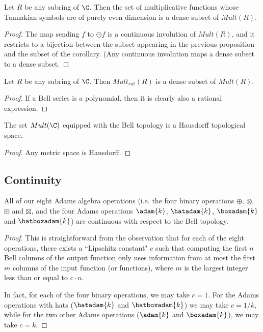 \documentclass[a4paper]{article}
\begin{document}
\begin{corollary}
Let $R$ be any subring of $\C$. Then the set of multiplicative functions whose Tannakian symbols are of purely even dimension is a dense subset of $Mult(R)$. 
\end{corollary}

\begin{proof}
The map sending $f$ to $\ominus f$ is a continuous involution of $Mult(R)$, and it restricts to a bijection between the subset appearing in the previous proposition and the subset of the corollary. (Any continuous involution maps a dense subset to a dense subset.
\end{proof}

\begin{corollary}
Let $R$ be any subring of $\C$. Then $Mult_{rat}(R)$ is a dense subset of $Mult(R)$. 
\end{corollary}

\begin{proof}
If a Bell series is a polynomial, then it is clearly also a rational expression.
\end{proof}

\begin{lemma}
The set $Mult(\C)$ equipped with the Bell topology is a Hausdorff topological space.
\end{lemma}
\begin{proof}
Any metric space is Hausdorff.
\end{proof}

\subsection{Continuity}


\begin{theorem} \label{AdamsAlgebraContinuity}
All of our eight Adams algebra operations (i.e. the four binary operations $\oplus$, $\otimes$, $\boxplus$ and $\boxtimes$, and the four Adams operations $\adam{k}$, $\hatadam{k}$, $\boxadam{k}$ and $\hatboxadam{k}$) are continuous with respect to the Bell topology.
\end{theorem}
\begin{proof}
This is straightforward from the observation that for each of the eight operations, there exists a ``Lipschitz constant" $c$ such that computing the first $n$ Bell columns of the output function only uses information from at most the first $m$ columns of the input function (or functions), where $m$ is the largest integer less than or equal to $c \cdot n$. 

In fact, for each of the four binary operations, we may take $c=1$. For the Adams operations with hats ($\hatadam{k}$ and $\hatboxadam{k}$) we may take $c= 1/k$, while for the two other Adams operations ($\adam{k}$ and $\boxadam{k}$), we may take $c=k$.
\end{proof}
\end{document}
